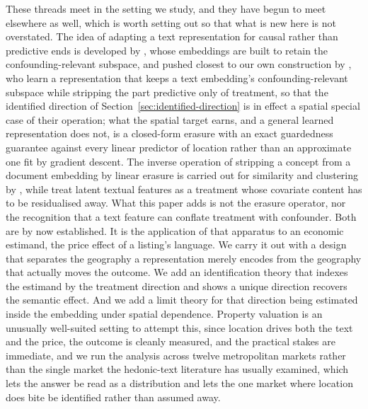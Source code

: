 \documentclass{article}
\begin{document}
These threads meet in the setting we study, and they have begun to meet elsewhere as well, which is worth setting out so that what is new here is not overstated. The idea of adapting a text representation for causal rather than predictive ends is developed by \citet{veitch2020adapting}, whose embeddings are built to retain the confounding-relevant subspace, and pushed closest to our own construction by \citet{guiveitch2023}, who learn a representation that keeps a text embedding's confounding-relevant subspace while stripping the part predictive only of treatment, so that the identified direction of Section~\ref{sec:identified-direction} is in effect a spatial special case of their operation; what the spatial target earns, and a general learned representation does not, is a closed-form erasure with an exact guardedness guarantee against every linear predictor of location rather than an approximate one fit by gradient descent. The inverse operation of stripping a concept from a document embedding by linear erasure is carried out for similarity and clustering by \citet{fan2025medium}, while \citet{feldman2026causal} treat latent textual features as a treatment whose covariate content has to be residualised away. What this paper adds is not the erasure operator, nor the recognition that a text feature can conflate treatment with confounder. Both are by now established. It is the application of that apparatus to an economic estimand, the price effect of a listing's language. We carry it out with a design that separates the geography a representation merely encodes from the geography that actually moves the outcome. We add an identification theory that indexes the estimand by the treatment direction and shows a unique direction recovers the semantic effect. And we add a limit theory for that direction being estimated inside the embedding under spatial dependence. Property valuation is an unusually well-suited setting to attempt this, since location drives both the text and the price, the outcome is cleanly measured, and the practical stakes are immediate, and we run the analysis across twelve metropolitan markets rather than the single market the hedonic-text literature has usually examined, which lets the answer be read as a distribution and lets the one market where location does bite be identified rather than assumed away.






\end{document}
